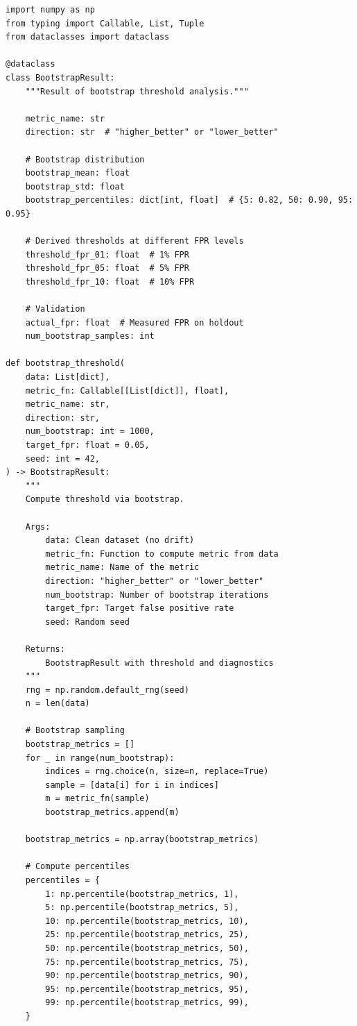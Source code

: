 \begin{lstlisting}[language=jsonx,caption={Threshold bootstrap implementation}]
import numpy as np
from typing import Callable, List, Tuple
from dataclasses import dataclass

@dataclass
class BootstrapResult:
    """Result of bootstrap threshold analysis."""
    
    metric_name: str
    direction: str  # "higher_better" or "lower_better"
    
    # Bootstrap distribution
    bootstrap_mean: float
    bootstrap_std: float
    bootstrap_percentiles: dict[int, float]  # {5: 0.82, 50: 0.90, 95: 0.95}
    
    # Derived thresholds at different FPR levels
    threshold_fpr_01: float  # 1% FPR
    threshold_fpr_05: float  # 5% FPR
    threshold_fpr_10: float  # 10% FPR
    
    # Validation
    actual_fpr: float  # Measured FPR on holdout
    num_bootstrap_samples: int

def bootstrap_threshold(
    data: List[dict],
    metric_fn: Callable[[List[dict]], float],
    metric_name: str,
    direction: str,
    num_bootstrap: int = 1000,
    target_fpr: float = 0.05,
    seed: int = 42,
) -> BootstrapResult:
    """
    Compute threshold via bootstrap.
    
    Args:
        data: Clean dataset (no drift)
        metric_fn: Function to compute metric from data
        metric_name: Name of the metric
        direction: "higher_better" or "lower_better"
        num_bootstrap: Number of bootstrap iterations
        target_fpr: Target false positive rate
        seed: Random seed
        
    Returns:
        BootstrapResult with threshold and diagnostics
    """
    rng = np.random.default_rng(seed)
    n = len(data)
    
    # Bootstrap sampling
    bootstrap_metrics = []
    for _ in range(num_bootstrap):
        indices = rng.choice(n, size=n, replace=True)
        sample = [data[i] for i in indices]
        m = metric_fn(sample)
        bootstrap_metrics.append(m)
    
    bootstrap_metrics = np.array(bootstrap_metrics)
    
    # Compute percentiles
    percentiles = {
        1: np.percentile(bootstrap_metrics, 1),
        5: np.percentile(bootstrap_metrics, 5),
        10: np.percentile(bootstrap_metrics, 10),
        25: np.percentile(bootstrap_metrics, 25),
        50: np.percentile(bootstrap_metrics, 50),
        75: np.percentile(bootstrap_metrics, 75),
        90: np.percentile(bootstrap_metrics, 90),
        95: np.percentile(bootstrap_metrics, 95),
        99: np.percentile(bootstrap_metrics, 99),
    }
    

\end{lstlisting}
